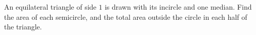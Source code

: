 An equilateral triangle of side $1$ is drawn with its incircle and one median. Find the area of each semicircle, and the total area outside the circle in each half of the triangle.
